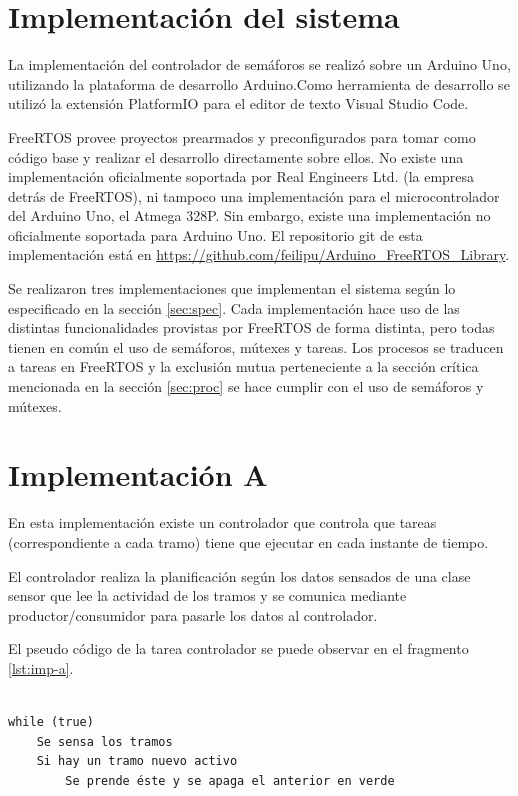 \section{Implementación del sistema}
La implementación del controlador de semáforos se realizó sobre un Arduino Uno, utilizando la plataforma de desarrollo Arduino.Como herramienta de desarrollo se utilizó la extensión PlatformIO para el editor de texto Visual Studio Code.

FreeRTOS provee proyectos prearmados y preconfigurados para tomar como código base y realizar el desarrollo directamente sobre ellos. No existe una implementación oficialmente soportada por Real Engineers Ltd. (la empresa detrás de FreeRTOS), ni tampoco una implementación para el microcontrolador del Arduino Uno, el Atmega 328P. Sin embargo, existe una implementación no oficialmente soportada para Arduino Uno. El repositorio git de esta implementación está en \url{https://github.com/feilipu/Arduino\_FreeRTOS\_Library}.

Se realizaron tres implementaciones que implementan el sistema según lo especificado en la sección \ref{sec:spec}. Cada implementación hace uso de las distintas funcionalidades provistas por FreeRTOS de forma distinta, pero todas tienen en común el uso de semáforos, mútexes y tareas. Los procesos se traducen a tareas en FreeRTOS y la exclusión mutua perteneciente a la sección crítica mencionada en la sección \ref{sec:proc} se hace cumplir con el uso de semáforos y mútexes.

\section{Implementación A}
En esta implementación existe un controlador que controla que tareas (correspondiente a cada tramo) tiene que ejecutar en cada instante de tiempo.

El controlador realiza la planificación según los datos sensados de una clase sensor que lee la actividad de los tramos y se comunica mediante productor/consumidor para pasarle los datos al controlador.

El pseudo código de la tarea controlador se puede observar en el fragmento \ref{lst:imp-a}.
\begin{lstlisting}[label=lst:imp-a, caption=Pseudocódigo de la tarea controlador.]

while (true)
	Se sensa los tramos
	Si hay un tramo nuevo activo
		Se prende éste y se apaga el anterior en verde
		
\end{lstlisting}

